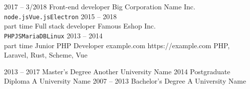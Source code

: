 \begin{minipage}[t]{0.5\textwidth}
    \vspace{-\baselineskip}


    \begin{entrylist}
        \entry
            {2017 -- 3/2018}
            {Front-end developer}
            {Big Corporation Name Inc.}
            {}
            {}
            {\lorem \lorem \lorem\\ \texttt{node.js}\slashsep\texttt{Vue.js}\slashsep\texttt{Electron}}
        \entry
            {2015 -- 2018\\\footnotesize{part time}}
            {Full stack developer}
            {Famous Eshop Inc.}
            {}
            {}
            {\lorem\lorem\\ \texttt{PHP}\slashsep\texttt{JS}\slashsep\texttt{MariaDB}\slashsep\texttt{Linux}}
        \entry
            {2013 -- 2014\\{\footnotesize part time }}
            {Junior PHP Developer}
            {example.com}
            {https://example.com}
            {PHP, Laravel, Rust, Scheme, Vue}
            {\entryitems{\lorem, \lorem}}
    \end{entrylist}


    \begin{entrylist}
        \entry
            {2013 -- 2017}
            {Master's Degree}
            {Another University Name}
            {}
            {}
            {\lorem\lorem\lorem}
        \entry
            {2014}
            {Postgraduate Diploma}
            {A University Name}
            {}
            {}
            {\lorem\lorem}
        \entry
            {2007 -- 2013}
            {Bachelor's Degree}
            {A University Name}
            {}
            {}
            {\lorem\lorem}
    \end{entrylist}
\end{minipage}
%
\hfill
